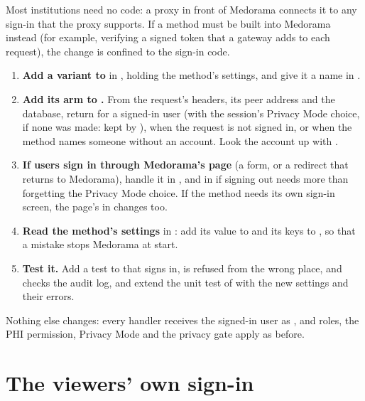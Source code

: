 Most institutions need no code: a proxy in front of Medorama connects it to any sign-in that the
proxy supports. If a method must be built into Medorama instead (for example, verifying a signed
token that a gateway adds to each request), the change is confined to the sign-in code.
\begin{enumerate}
\item \textbf{Add a variant to } in , holding
  the method's settings, and give it a name in .
\item \textbf{Add its arm to .} From the request's headers, its peer
  address and the database, return  for a signed-in user (with
  the session's Privacy Mode choice,  if none was made: kept by
  ),
   when the request is not signed in, or  when the
  method names someone without an account. Look the account up with
  .
\item \textbf{If users sign in through Medorama's page} (a form, or a redirect that returns to
  Medorama), handle it in , and in  if signing out needs
  more than forgetting the Privacy Mode choice. If the method needs its own sign-in screen, the
  page's  in  changes too.
\item \textbf{Read the method's settings} in : add its value to
   and its keys to , so that a mistake stops Medorama at
  start.
\item \textbf{Test it.} Add a test to  that signs in, is refused
  from the wrong place, and checks the audit log, and extend the unit test
   of  with the new settings and their errors.
\end{enumerate}
Nothing else changes: every handler receives the signed-in user as ,
and roles, the PHI permission, Privacy Mode and the privacy gate apply as before.

\section{The viewers' own sign-in}
\label{sec:sign-in-viewers}

